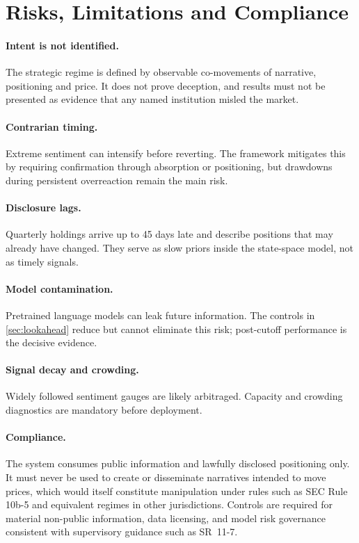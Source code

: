 \documentclass[11pt,a4paper]{article}
\theoremstyle{plain}
\theoremstyle{definition}
\theoremstyle{remark}
\begin{document}
\section{Risks, Limitations and Compliance}\label{sec:risks}

\paragraph{Intent is not identified.} The strategic regime is defined by observable co-movements of narrative, positioning and price. It does not prove deception, and results must not be presented as evidence that any named institution misled the market.

\paragraph{Contrarian timing.} Extreme sentiment can intensify before reverting. The framework mitigates this by requiring confirmation through absorption or positioning, but drawdowns during persistent overreaction remain the main risk.

\paragraph{Disclosure lags.} Quarterly holdings arrive up to 45 days late and describe positions that may already have changed. They serve as slow priors inside the state-space model, not as timely signals.

\paragraph{Model contamination.} Pretrained language models can leak future information. The controls in \cref{sec:lookahead} reduce but cannot eliminate this risk; post-cutoff performance is the decisive evidence.

\paragraph{Signal decay and crowding.} Widely followed sentiment gauges are likely arbitraged. Capacity and crowding diagnostics are mandatory before deployment.

\paragraph{Compliance.} The system consumes public information and lawfully disclosed positioning only. It must never be used to create or disseminate narratives intended to move prices, which would itself constitute manipulation under rules such as SEC Rule 10b-5 and equivalent regimes in other jurisdictions. Controls are required for material non-public information, data licensing, and model risk governance consistent with supervisory guidance such as SR~11-7.
\end{document}
